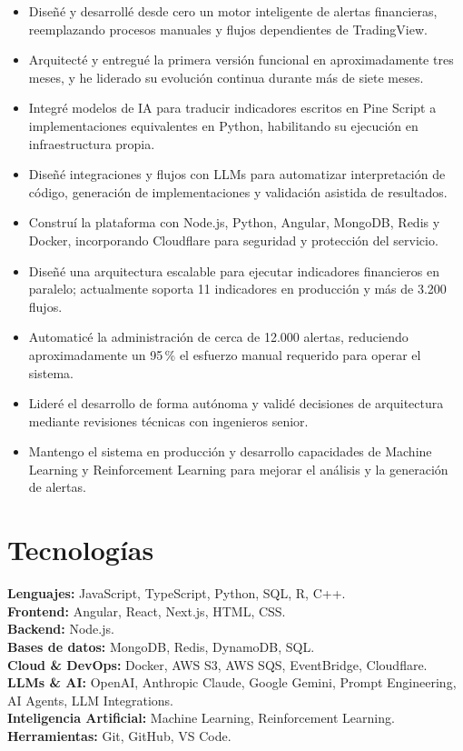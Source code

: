 \documentclass[10pt,letterpaper]{article}
\begin{document}
\begin{itemize}
  \item Dise\~n\'e y desarroll\'e desde cero un motor inteligente de alertas financieras, reemplazando procesos manuales y flujos dependientes de TradingView.
  \item Arquitect\'e y entregu\'e la primera versi\'on funcional en aproximadamente tres meses, y he liderado su evoluci\'on continua durante m\'as de siete meses.
  \item Integr\'e modelos de IA para traducir indicadores escritos en Pine Script a implementaciones equivalentes en Python, habilitando su ejecuci\'on en infraestructura propia.
  \item Dise\~n\'e integraciones y flujos con LLMs para automatizar interpretaci\'on de c\'odigo, generaci\'on de implementaciones y validaci\'on asistida de resultados.
  \item Constru\'i la plataforma con Node.js, Python, Angular, MongoDB, Redis y Docker, incorporando Cloudflare para seguridad y protecci\'on del servicio.
  \item Dise\~n\'e una arquitectura escalable para ejecutar indicadores financieros en paralelo; actualmente soporta 11 indicadores en producci\'on y m\'as de 3.200 flujos.
  \item Automatic\'e la administraci\'on de cerca de 12.000 alertas, reduciendo aproximadamente un 95\,\% el esfuerzo manual requerido para operar el sistema.
  \item Lider\'e el desarrollo de forma aut\'onoma y valid\'e decisiones de arquitectura mediante revisiones t\'ecnicas con ingenieros senior.
  \item Mantengo el sistema en producci\'on y desarrollo capacidades de Machine Learning y Reinforcement Learning para mejorar el an\'alisis y la generaci\'on de alertas.
\end{itemize}

\section{Tecnolog\'ias}

\textbf{Lenguajes:} JavaScript, TypeScript, Python, SQL, R, C++.\\
\textbf{Frontend:} Angular, React, Next.js, HTML, CSS.\\
\textbf{Backend:} Node.js.\\
\textbf{Bases de datos:} MongoDB, Redis, DynamoDB, SQL.\\
\textbf{Cloud \& DevOps:} Docker, AWS S3, AWS SQS, EventBridge, Cloudflare.\\
\textbf{LLMs \& AI:} OpenAI, Anthropic Claude, Google Gemini, Prompt Engineering, AI Agents, LLM Integrations.\\
\textbf{Inteligencia Artificial:} Machine Learning, Reinforcement Learning.\\
\textbf{Herramientas:} Git, GitHub, VS Code.
\end{document}
